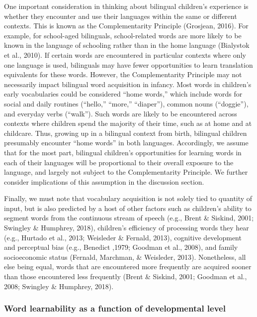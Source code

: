 \documentclass[
  english,
  ,man,floatsintext]{apa6}
\begin{document}
One important consideration in thinking about bilingual children's experience is whether they encounter and use their languages within the same or different contexts. This is known as the Complementarity Principle (Grosjean, 2016). For example, for school-aged bilinguals, school-related words are more likely to be known in the language of schooling rather than in the home language (Bialystok et al., 2010). If certain words are encountered in particular contexts where only one language is used, bilinguals may have fewer opportunities to learn translation equivalents for these words. However, the Complementarity Principle may not necessarily impact bilingual word acquisition in infancy. Most words in children's early vocabularies could be considered ``home words,'' which include words for social and daily routines (``hello,'' ``more,'' ``diaper''), common nouns (``doggie''), and everyday verbs (``walk''). Such words are likely to be encountered across contexts where children spend the majority of their time, such as at home and at childcare. Thus, growing up in a bilingual context from birth, bilingual children presumably encounter ``home words'' in both languages. Accordingly, we assume that for the most part, bilingual children's opportunities for learning words in each of their languages will be proportional to their overall exposure to the language, and largely not subject to the Complementarity Principle. We further consider implications of this assumption in the discussion section.

Finally, we must note that vocabulary acquisition is not solely tied to quantity of input, but is also predicted by a host of other factors such as children's ability to segment words from the continuous stream of speech (e.g., Brent \& Siskind, 2001; Swingley \& Humphrey, 2018), children's efficiency of processing words they hear (e.g., Hurtado et al., 2013; Weisleder \& Fernald, 2013), cognitive development and perceptual bias (e.g., Benedict ,1979; Goodman et al., 2008), and family socioeconomic status (Fernald, Marchman, \& Weisleder, 2013). Nonetheless, all else being equal, words that are encountered more frequently are acquired sooner than those encountered less frequently (Brent \& Siskind, 2001; Goodman et al., 2008; Swingley \& Humphrey, 2018).

\hypertarget{word-learnability-as-a-function-of-developmental-level}{%
\subsubsection{Word learnability as a function of developmental level}\label{word-learnability-as-a-function-of-developmental-level}}
\end{document}

